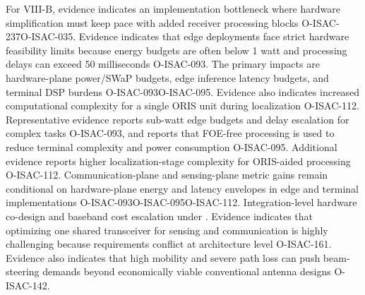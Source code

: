  For VIII-B, evidence indicates an implementation bottleneck where hardware simplification must keep pace with added receiver processing blocks O-ISAC-237O-ISAC-035.\markdownRendererOlItemEnd 
\markdownRendererOlEnd \markdownRendererInterblockSeparator
{}
\markdownRendererSectionEnd \markdownRendererSectionBegin
{}\markdownRendererInterblockSeparator
{}\markdownRendererOlBegin
{} Evidence indicates that edge deployments face strict hardware feasibility limits because energy budgets are often below 1 watt and processing delays can exceed 50 milliseconds O-ISAC-093.\markdownRendererOlItemEnd 
{} The primary impacts are hardware-plane power/SWaP budgets, edge inference latency budgets, and terminal DSP burdens O-ISAC-093O-ISAC-095. Evidence also indicates increased computational complexity for a single ORIS unit during localization O-ISAC-112.\markdownRendererOlItemEnd 
{} Representative evidence reports sub-watt edge budgets and delay escalation for complex tasks O-ISAC-093, and reports that FOE-free processing is used to reduce terminal complexity and power consumption O-ISAC-095. Additional evidence reports higher localization-stage complexity for ORIS-aided processing O-ISAC-112.\markdownRendererOlItemEnd 
{} Communication-plane and sensing-plane metric gains remain conditional on hardware-plane energy and latency envelopes in edge and terminal implementations O-ISAC-093O-ISAC-095O-ISAC-112.\markdownRendererOlItemEnd 
\markdownRendererOlEnd \markdownRendererInterblockSeparator
{}
\markdownRendererSectionEnd \markdownRendererSectionBegin
{}\markdownRendererInterblockSeparator
{}\markdownRendererOlBegin
{} Integration-level hardware co-design and baseband cost escalation under .\markdownRendererOlItemEnd 
{} Evidence indicates that optimizing one shared transceiver for sensing and communication is highly challenging because requirements conflict at architecture level O-ISAC-161. Evidence also indicates that high mobility and severe path loss can push beam-steering demands beyond economically viable conventional antenna designs O-ISAC-142.\markdownRendererOlItemEnd 
